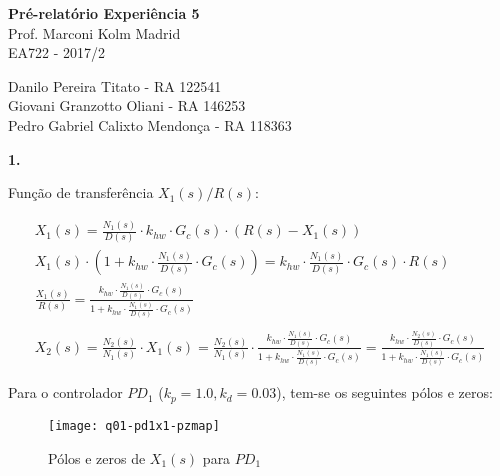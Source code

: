 \documentclass[a4paper,11pt]{article}
\begin{document}
	

\begin{center}
\textbf{Pré-relatório Experiência 5} \\
\hspace{5pt}
Prof. Marconi Kolm Madrid \\
EA722 - 2017/2
\end{center}

\begin{center}
Danilo Pereira Titato - RA 122541 \\
Giovani Granzotto Oliani - RA 146253 \\
Pedro Gabriel Calixto Mendonça - RA 118363
\end{center}

\textbf{1.}

Função de transferência $X_1\left(s\right) / R\left(s\right)$:

\begin{gather*}
    X_1\left(s\right) = \frac{N_1\left(s\right)}{D\left(s\right)} \cdot k_{hw}
        \cdot G_c\left(s\right) \cdot \left(R\left(s\right) -
        X_1\left(s\right)\right) \\
    X_1\left(s\right) \cdot \left(1 + k_{hw} \cdot
        \frac{N_1\left(s\right)}{D\left(s\right)} \cdot G_c\left(s\right)\right)
        = k_{hw} \cdot \frac{N_1\left(s\right)}{D\left(s\right)} \cdot
        G_c\left(s\right) \cdot R\left(s\right) \\
    \frac{X_1\left(s\right)}{R\left(s\right)} = \frac{k_{hw} \cdot
        \frac{N_1\left(s\right)}{D\left(s\right)} \cdot G_c\left(s\right)}
        {1 + k_{hw} \cdot \frac{N_1\left(s\right)}{D\left(s\right)} \cdot
        G_c\left(s\right)} \\ \\
    X_2\left(s\right) = \frac{N_2\left(s\right)}{N_1\left(s\right)} \cdot
        X_1\left(s\right) =
        \frac{N_2\left(s\right)}{N_1\left(s\right)} \cdot \frac{k_{hw} \cdot
        \frac{N_1\left(s\right)}{D\left(s\right)} \cdot G_c\left(s\right)}{1 +
        k_{hw} \cdot \frac{N_1\left(s\right)}{D\left(s\right)} \cdot
        G_c\left(s\right)} =
        \frac{k_{hw} \cdot \frac{N_2\left(s\right)}{D\left(s\right)} \cdot
        G_c\left(s\right)}{1 + k_{hw} \cdot \frac{N_1\left(s\right)}
        {D\left(s\right)} \cdot G_c\left(s\right)}
\end{gather*}

Para o controlador $PD_1$ ($k_p = 1.0, k_d = 0.03$), tem-se os seguintes pólos e
zeros:

\begin{figure}[H]
\centering
\texttt{[image: q01-pd1x1-pzmap]}
\caption{Pólos e zeros de $X_1\left(s\right)$ para $PD_1$}
\end{figure}
\end{document}
